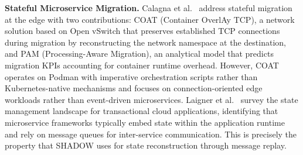 \documentclass[conference]{IEEEtran}
\begin{document}
\textbf{Stateful Microservice Migration.}
Calagna et al.~\cite{calagna2024coat} address stateful migration at the edge
with two contributions: COAT (Container OverlAy TCP), a network solution based
on Open vSwitch that preserves established TCP connections during migration by
reconstructing the network namespace at the destination, and PAM
(Processing-Aware Migration), an analytical model that predicts migration KPIs
accounting for container runtime overhead. However, COAT operates on Podman with
imperative orchestration scripts rather than Kubernetes-native mechanisms and
focuses on connection-oriented edge workloads rather than event-driven
microservices. Laigner et al.~\cite{laigner2025transactional} survey the state
management landscape for transactional cloud applications, identifying that
microservice frameworks typically embed state within the application runtime and
rely on message queues for inter-service communication. This is precisely the
property that SHADOW uses for state reconstruction through message replay.
%
\end{document}
